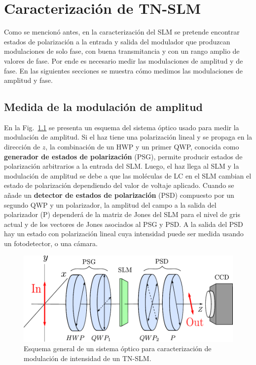 \chapter{Caracterización de TN-SLM}
\label{cha:Gen_carac}
\label{sec:ChGV_Caracterizacion_de_SLM}

Como se mencionó antes, en la caracterización del SLM se pretende
encontrar estados de polarización a la entrada y salida del modulador
que produzcan modulaciones de solo fase, con buena transmitancia y con
un rango amplio de valores de fase. 
Por ende es necesario medir las modulaciones de amplitud y de fase. En
las siguientes secciones se muestra cómo medimos las modulaciones de
amplitud y fase. 

\section{Medida de la modulación de amplitud}
\label{sec:ChGV_med_mod_amp}

En la Fig.~\ref{fig:PSG_PSD} se presenta un esquema del sistema
óptico usado para medir la modulación de amplitud. Si el haz tiene una
polarización lineal y se propaga en la dirección de $z$, la combinación
de un HWP y un primer QWP, conocida como \textbf{generador de estados de
polarización} (\acrshort{PSG}), permite producir estados de polarización
arbitrarios a la entrada del SLM. Luego, el haz llega al SLM y la modulación de amplitud se
debe a que las moléculas de LC en el SLM cambian el estado de
polarización dependiendo del valor de voltaje aplicado. Cuando se añade un \textbf{detector de estados de
polarización} (\acrshort{PSD}) compuesto por un segundo QWP y un polarizador, la amplitud del campo a la salida del polarizador
(P) dependerá de la matriz de Jones del SLM para el nivel de gris
actual y de los vectores de Jones asociados al PSG y PSD. A la salida
del PSD hay un estado con polarización lineal cuya intensidad puede
ser medida usando un fotodetector, o una cámara. 
 \begin{figure}[h!]
\centering
\includegraphics[scale=.8]{PSG_PSD.pdf}
\caption[Esquema de un sistema generador y analizador de estados de
polarización]{Esquema general de un sistema óptico para
  caracterización de modulación de intensidad de un TN-SLM.}
\label{fig:PSG_PSD}
\end{figure}

